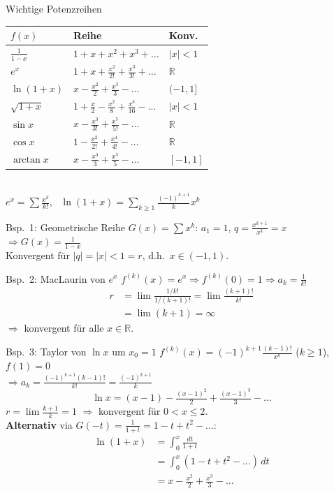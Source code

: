 \documentclass[a4paper, fontsize=7pt]{scrartcl}
\def\R{\mathbb{R}}  %
\renewcommand*{\arraystretch}{1.5}  %
\begin{document}
\begin{mainbox}{Wichtige Potenzreihen}
\renewcommand*{\arraystretch}{1.6}
\setlength{\tabcolsep}{2pt}
\begin{tabular}{l|l|l}
$f(x)$ & Reihe & Konv. \\
\hline
$\frac{1}{1-x}$ & $1 + x + x^2 + x^3 + \ldots$ & $|x| < 1$ \\
$e^x$ & $1 + x + \frac{x^2}{2!} + \frac{x^3}{3!} + \ldots$ & $\R$ \\
$\ln(1+x)$ & $x - \frac{x^2}{2} + \frac{x^3}{3} - \ldots$ & $(-1, 1]$ \\
$\sqrt{1+x}$ & $1 + \frac{x}{2} - \frac{x^2}{8} + \frac{x^3}{16} - \ldots$
& $|x| < 1$ \\
$\sin x$ & $x - \frac{x^3}{3!} + \frac{x^5}{5!} - \ldots$ & $\R$ \\
$\cos x$ & $1 - \frac{x^2}{2!} + \frac{x^4}{4!} - \ldots$ & $\R$ \\
$\arctan x$ & $x - \frac{x^3}{3} + \frac{x^5}{5} - \ldots$ & $[-1, 1]$ \\
\end{tabular}\\
$e^x = \sum \frac{x^k}{k!}$, \ $\ln(1+x) = \sum_{k \ge 1}
\frac{(-1)^{k+1}}{k} x^k$
\end{mainbox}

\begin{subbox}{Bsp.\ 1: Geometrische Reihe}
$G(x) = \sum x^k$: $a_1 = 1$, $q = \frac{x^{k+1}}{x^k} = x$
$\Rightarrow G(x) = \frac{1}{1 - x}$\\
Konvergent für $|q| = |x| < 1 = r$, d.h.\ $x \in (-1, 1)$.
\end{subbox}

\begin{subbox}{Bsp.\ 2: MacLaurin von $e^x$}
$f^{(k)}(x) = e^x \Rightarrow f^{(k)}(0) = 1 \Rightarrow a_k = \frac{1}{k!}$
\begin{align*}
r &= \lim \frac{1/k!}{1/(k+1)!} = \lim \frac{(k+1)!}{k!}\\
&= \lim (k+1) = \infty
\end{align*}
$\Rightarrow$ konvergent für alle $x \in \R$.
\end{subbox}

\begin{subbox}{Bsp.\ 3: Taylor von $\ln x$ um $x_0 = 1$}
$f^{(k)}(x) = (-1)^{k+1}\frac{(k-1)!}{x^k}$ ($k \ge 1$), $f(1) = 0$\\
$\Rightarrow a_k = \frac{(-1)^{k+1}(k-1)!}{k!} = \frac{(-1)^{k+1}}{k}$
$$\ln x = (x-1) - \tfrac{(x-1)^2}{2} + \tfrac{(x-1)^3}{3} - \ldots$$
$r = \lim \frac{k+1}{k} = 1$ $\Rightarrow$ konvergent für $0 < x \le 2$.\\
\textbf{Alternativ} via $G(-t) = \frac{1}{1+t} = 1 - t + t^2 - \ldots$:
\begin{align*}
\ln(1+x) &= \int_0^x \frac{dt}{1+t}\\
&= \int_0^x (1 - t + t^2 - \ldots)\,dt\\
&= x - \tfrac{x^2}{2} + \tfrac{x^3}{3} - \ldots
\end{align*}
\end{subbox}
\end{document}
